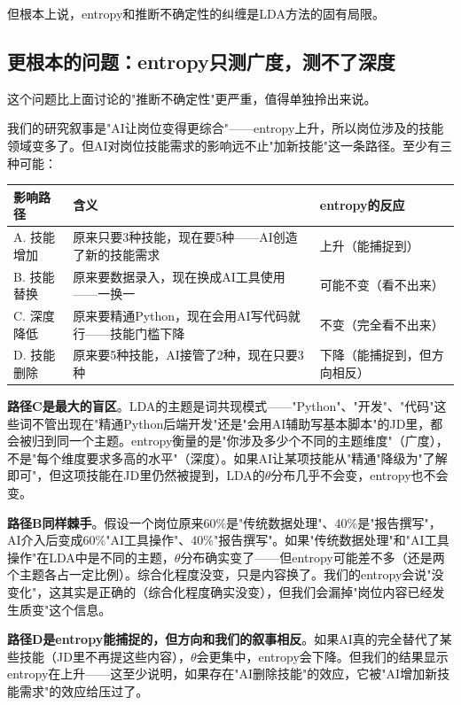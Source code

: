\documentclass[12pt,a4paper]{ctexart}
\begin{document}
但根本上说，entropy和推断不确定性的纠缠是LDA方法的固有局限。

\subsection{更根本的问题：entropy只测广度，测不了深度}

这个问题比上面讨论的"推断不确定性"更严重，值得单独拎出来说。

我们的研究叙事是"AI让岗位变得更综合"——entropy上升，所以岗位涉及的技能领域变多了。但AI对岗位技能需求的影响远不止"加新技能"这一条路径。至少有三种可能：

\begin{table}[h]
\centering
\begin{tabular}{p{2.5cm}p{5.5cm}p{4.5cm}}
\toprule
\textbf{影响路径} & \textbf{含义} & \textbf{entropy的反应} \\
\midrule
A. 技能增加 & 原来只要3种技能，现在要5种——AI创造了新的技能需求 & 上升（能捕捉到）\\
B. 技能替换 & 原来要数据录入，现在换成AI工具使用——一换一 & 可能不变（看不出来）\\
C. 深度降低 & 原来要精通Python，现在会用AI写代码就行——技能门槛下降 & 不变（完全看不出来）\\
D. 技能删除 & 原来要5种技能，AI接管了2种，现在只要3种 & 下降（能捕捉到，但方向相反）\\
\bottomrule
\end{tabular}
\end{table}

\textbf{路径C是最大的盲区}。LDA的主题是词共现模式——"Python"、"开发"、"代码"这些词不管出现在"精通Python后端开发"还是"会用AI辅助写基本脚本"的JD里，都会被归到同一个主题。entropy衡量的是"你涉及多少个不同的主题维度"（广度），不是"每个维度要求多高的水平"（深度）。如果AI让某项技能从"精通"降级为"了解即可"，但这项技能在JD里仍然被提到，LDA的$\theta$分布几乎不会变，entropy也不会变。

\textbf{路径B同样棘手}。假设一个岗位原来60\%是"传统数据处理"、40\%是"报告撰写"，AI介入后变成60\%"AI工具操作"、40\%"报告撰写"。如果"传统数据处理"和"AI工具操作"在LDA中是不同的主题，$\theta$分布确实变了——但entropy可能差不多（还是两个主题各占一定比例）。综合化程度没变，只是内容换了。我们的entropy会说"没变化"，这其实是正确的（综合化程度确实没变），但我们会漏掉"岗位内容已经发生质变"这个信息。

\textbf{路径D是entropy能捕捉的，但方向和我们的叙事相反}。如果AI真的完全替代了某些技能（JD里不再提这些内容），$\theta$会更集中，entropy会下降。但我们的结果显示entropy在上升——这至少说明，如果存在"AI删除技能"的效应，它被"AI增加新技能需求"的效应给压过了。
\end{document}
